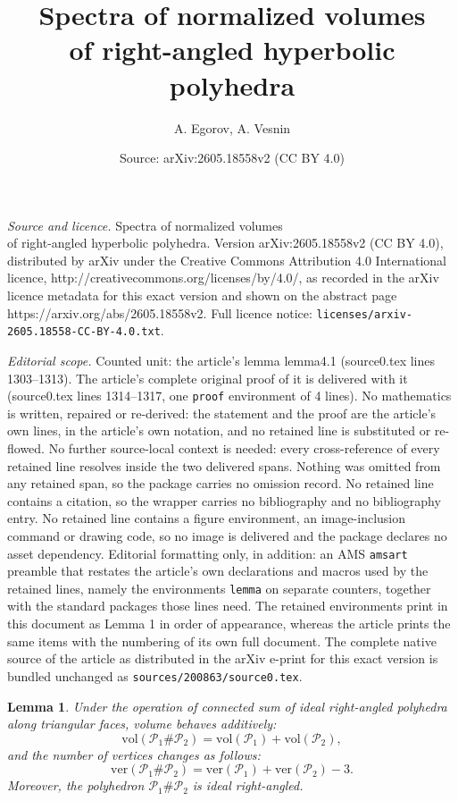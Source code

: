 \documentclass[10pt,a4paper]{amsart}
\title{Spectra of normalized volumes \\ of right-angled hyperbolic polyhedra}
\author{A. Egorov, A. Vesnin}
\date{Source: arXiv:2605.18558v2 (CC BY 4.0)}
\newtheorem{lemma}{Lemma}
\newcommand{\ver}{\mathrm{ver}}
\newcommand{\vol}{\mathrm{vol}}
\begin{document}
\maketitle

\noindent\emph{Source and licence.} Spectra of normalized volumes \\ of right-angled hyperbolic polyhedra. Version arXiv:2605.18558v2 (CC BY 4.0), distributed by arXiv under the Creative Commons Attribution 4.0 International licence, http://creativecommons.org/licenses/by/4.0/, as recorded in the arXiv licence metadata for this exact version and shown on the abstract page https://arxiv.org/abs/2605.18558v2. Full licence notice: \texttt{licenses/arxiv-2605.18558-CC-BY-4.0.txt}.\par\smallskip

\noindent\textit{Editorial scope.} Counted unit: the article's lemma lemma4.1 (source0.tex lines 1303--1313). The article's complete original proof of it is delivered with it (source0.tex lines 1314--1317, one \texttt{proof} environment of 4 lines). No mathematics is written, repaired or re-derived: the statement and the proof are the article's own lines, in the article's own notation, and no retained line is substituted or re-flowed.  No further source-local context is needed: every cross-reference of every retained line resolves inside the two delivered spans.  Nothing was omitted from any retained span, so the package carries no omission record.  No retained line contains a citation, so the wrapper carries no bibliography and no bibliography entry.  No retained line contains a figure environment, an image-inclusion command or drawing code, so no image is delivered and the package declares no asset dependency.  Editorial formatting only, in addition: an AMS \texttt{amsart} preamble that restates the article's own declarations and macros used by the retained lines, namely the environments \texttt{lemma} on separate counters, together with the standard packages those lines need.  The retained environments print in this document as Lemma 1 in order of appearance, whereas the article prints the same items with the numbering of its own full document.  The complete native source of the article as distributed in the arXiv e-print for this exact version is bundled unchanged as \texttt{sources/200863/source0.tex}.
	\begin{lemma} \label{lemma4.1}
		Under the operation of connected sum of ideal right-angled polyhedra along triangular faces, volume behaves additively: 
		$$
		\vol(\mathcal P_1 \# \mathcal P_2) = \vol(\mathcal P_1) + \vol(\mathcal P_2),
		$$
		and the number of vertices changes as follows:
		$$
		\ver(\mathcal P_1 \# \mathcal P_2) = \ver(\mathcal P_1) + \ver(\mathcal P_2) - 3.
		$$
		Moreover, the polyhedron $\mathcal P_1 \# \mathcal P_2$ is ideal right-angled.
	\end{lemma}
\end{document}
